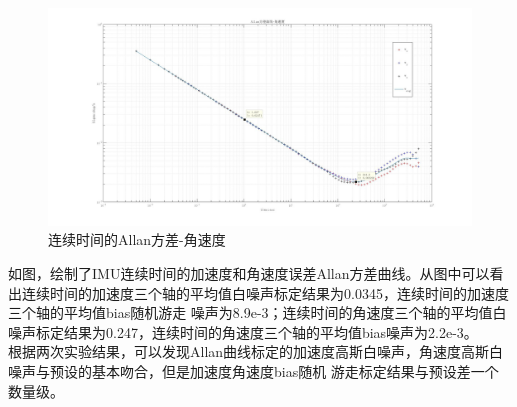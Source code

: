 \documentclass[UTF8]{ctexart}
\begin{document}
\begin{figure}[H]
\centering
\includegraphics[width=1\textwidth]{gyo_allan2.jpg}    
\caption{连续时间的Allan方差-角速度}
\label{img1}
\end{figure}
\indent 如图，绘制了IMU连续时间的加速度和角速度误差Allan方差曲线。从图中可以看出连续时间的加速度三个轴的平均值白噪声标定结果为0.0345，连续时间的加速度三个轴的平均值bias随机游走
噪声为8.9e-3；连续时间的角速度三个轴的平均值白噪声标定结果为0.247，连续时间的角速度三个轴的平均值bias噪声为2.2e-3。\\
\indent 根据两次实验结果，可以发现Allan曲线标定的加速度高斯白噪声，角速度高斯白噪声与预设的基本吻合，但是加速度角速度bias随机
游走标定结果与预设差一个数量级。\\
\end{document}
